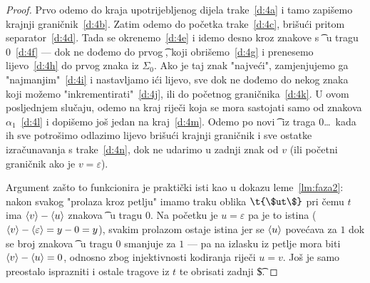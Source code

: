 \begin{proof}
Prvo odemo do kraja upotrijebljenog dijela trake~\eqref{d:4a} i tamo zapišemo krajnji graničnik~\eqref{d:4b}. Zatim odemo do početka trake~\eqref{d:4c}, brišući pritom separator~\eqref{d:4d}. Tada se okrenemo~\eqref{d:4e} i idemo desno kroz znakove s \t\textopenbullet\ u tragu $0$~\eqref{d:4f} --- dok ne dođemo do prvog \t\textbullet, koji obrišemo~\eqref{d:4g} i prenesemo lijevo~\eqref{d:4h} do prvog znaka iz $\Sigma_0$. Ako je taj znak "najveći", zamjenjujemo ga "najmanjim"~\eqref{d:4i} i nastavljamo ići lijevo, sve dok ne dođemo do nekog znaka koji možemo "inkrementirati"~\eqref{d:4j}, ili do početnog graničnika~\eqref{d:4k}. U ovom posljednjem slučaju, odemo na kraj riječi koja se mora sastojati samo od znakova $\alpha_1$~\eqref{d:4l} i dopišemo još jedan na kraj~\eqref{d:4m}. Odemo po novi~\t\textbullet\ iz traga $0$\dots\ kada ih sve potrošimo odlazimo lijevo brišući krajnji graničnik i sve ostatke izračunavanja s trake~\eqref{d:4n}, dok ne udarimo u zadnji znak od $v$ (ili početni graničnik ako je $v=\varepsilon$).

Argument zašto to funkcionira je praktički isti kao u dokazu leme~\ref{lm:faza2}: nakon svakog "prolaza kroz petlju" imamo traku oblika $\t{\$ut\$}$ pri čemu $t$ ima $\langle v\rangle-\langle u\rangle$ znakova \t\textbullet\ u tragu $0$. Na početku je $u=\varepsilon$ pa je to istina ($\langle v\rangle-\langle\varepsilon\rangle=y-0=y$), svakim prolazom ostaje istina jer se $\langle u\rangle$ povećava za $1$ dok se broj znakova \t\textbullet\ u tragu $0$ smanjuje za $1$ --- pa na izlasku iz petlje mora biti $\langle v\rangle-\langle u\rangle=0$, odnosno zbog injektivnosti kodiranja riječi $u=v$. Još je samo preostalo isprazniti i ostale tragove iz $t$ te obrisati zadnji \t\$.
\end{proof}

